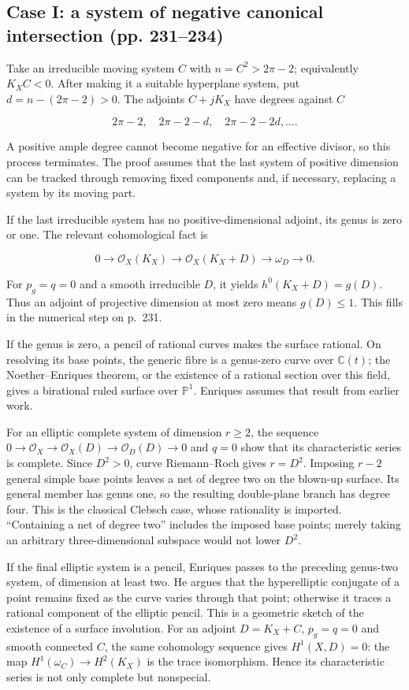 \subsection{Case I: a system of negative canonical intersection (pp. 231–234)}

Take an irreducible moving system \(C\) with \(n=C^2>2\pi-2\); equivalently \(K_X C<0\). After making it a suitable hyperplane system, put \(d=n-(2\pi-2)>0\). The adjoints \(C+jK_X\) have degrees against \(C\)

\[
2\pi-2,\quad2\pi-2-d,\quad2\pi-2-2d,\ldots.
\]

A positive ample degree cannot become negative for an effective divisor, so this process terminates. The proof assumes that the last system of positive dimension can be tracked through removing fixed components and, if necessary, replacing a system by its moving part.

If the last irreducible system has no positive-dimensional adjoint, its genus is zero or one. The relevant cohomological fact is

\[
0\longrightarrow\mathcal O_X(K_X)\longrightarrow
\mathcal O_X(K_X+D)\longrightarrow\omega_D\longrightarrow0.
\]

For \(p_g=q=0\) and a smooth irreducible \(D\), it yields \(h^0(K_X+D)=g(D)\). Thus an adjoint of projective dimension at most zero means \(g(D)\leq1\). This fills in the numerical step on p.~231.

If the genus is zero, a pencil of rational curves makes the surface rational. On resolving its base points, the generic fibre is a genus-zero curve over \(\mathbb C(t)\); the Noether--Enriques theorem, or the existence of a rational section over this field, gives a birational ruled surface over \(\mathbb P^1\). Enriques assumes that result from earlier work.

For an elliptic complete system of dimension \(r\geq2\), the sequence \(0\to\mathcal O_X\to\mathcal O_X(D)\to\mathcal O_D(D)\to0\) and \(q=0\) show that its characteristic series is complete. Since \(D^2>0\), curve Riemann--Roch gives \(r=D^2\). Imposing \(r-2\) general simple base points leaves a net of degree two on the blown-up surface. Its general member has genus one, so the resulting double-plane branch has degree four. This is the classical Clebsch case, whose rationality is imported. ``Containing a net of degree two'' includes the imposed base points; merely taking an arbitrary three-dimensional subspace would not lower \(D^2\).

If the final elliptic system is a pencil, Enriques passes to the preceding genus-two system, of dimension at least two. He argues that the hyperelliptic conjugate of a point remains fixed as the curve varies through that point; otherwise it traces a rational component of the elliptic pencil. This is a geometric sketch of the existence of a surface involution. For an adjoint \(D=K_X+C\), \(p_g=q=0\) and smooth connected \(C\), the same cohomology sequence gives \(H^1(X,D)=0\): the map \(H^1(\omega_C)\to H^2(K_X)\) is the trace isomorphism. Hence its characteristic series is not only complete but nonspecial.

